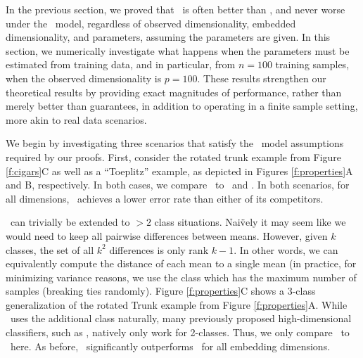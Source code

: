 \documentclass[10pt]{article}
\begin{document}


In the previous section, we proved that \Lol~is often better than \Pca, and never worse under the \Lda~model, regardless of observed dimensionality, embedded dimensionality, and parameters, assuming the parameters are given.  In this section, we numerically investigate what happens when the parameters must be estimated from training data, and in particular, from $n=100$ training samples, when the observed dimensionality is $p=100$.  These results strengthen our theoretical results by providing exact magnitudes of performance, rather than merely better than guarantees, in addition to operating in a finite sample setting, more akin to real data scenarios.

 We begin by investigating three scenarios that satisfy the \Lda~model assumptions required by our proofs. First, consider  the rotated trunk example from Figure \ref{f:cigars}C as well as a ``Toeplitz'' example, as depicted in Figures \ref{f:properties}A and B, respectively.  In both cases, we compare \Lol~to \FoP~and \Road.  In both scenarios, for all dimensions, \Lol~achieves a lower error rate than either of its competitors.


 \Lol~can trivially be extended to $>2$ class situations.  Nai\"vely it may seem like we would need to keep all pairwise differences between means.  However, given $k$ classes, the set of all $k^2$ differences is only rank $k-1$.  In other words, we can equivalently compute the distance of each mean to a single mean (in practice, for minimizing variance reasons, we use the class which has the maximum number of samples (breaking ties randomly).  Figure \ref{f:properties}C shows a 3-class generalization of the rotated Trunk example from Figure \ref{f:properties}A.  While \Lol~uses the additional class naturally,  many previously proposed high-dimensional classifiers, such as \Road, natively only work for 2-classes. Thus, we only compare \Lol~to \PoF~here. As before, \Lol~significantly outperforms \PoF~for all embedding dimensions.
\end{document}
